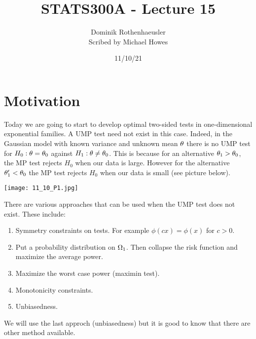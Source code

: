 




\title{STATS300A - Lecture 15}
\author{Dominik Rothenhaeusler\\ Scribed by Michael Howes}
\date{11/10/21}

\pagestyle{fancy}
\fancyhf{}


\maketitle
\tableofcontents
\section{Motivation}
Today we are going to start to develop optimal two-sided tests in one-dimensional exponential families. A UMP test need not exist in this case. Indeed, in the Gaussian model with known variance and unknown mean ${\theta}$ there is no UMP test for $H_0 : {\theta} ={\theta}_0$ against $H_1 : {\theta} \neq {\theta}_0$. This is because for an alternative ${\theta}_1 > {\theta}_0$, the MP test rejects $H_0$ when our data is large. However for the alternative ${\theta}_1' < {\theta}_0$ the MP test rejects $H_0$ when our data is small (see picture below).

\begin{center}
    \texttt{[image: 11\_10\_P1.jpg]}
\end{center}


There are various approaches that can be used when the UMP test does not exist. These include:
\begin{enumerate}
    \item Symmetry constraints on tests. For example $\phi (c x) = \phi(x)$ for $c >0$.
    \item Put a probability distribution on ${{\Omega}}_1$. Then collapse the risk function and maximize the average power.
    \item Maximize the worst case power (maximin test).
    \item Monotonicity constraints.
    \item Unbiasedness.
\end{enumerate}

We will use the last approch (unbiasedness) but it is good to know that there are other method available. 
